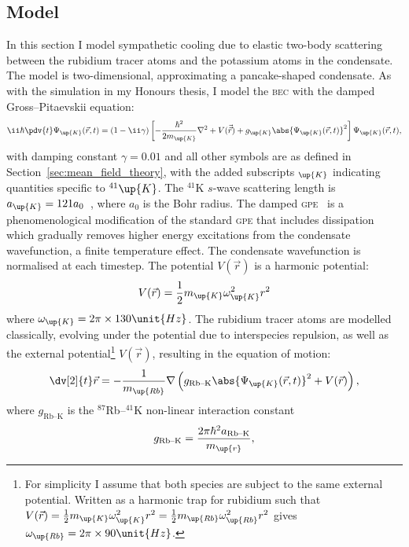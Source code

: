 \subsection{Model}

In this section I model sympathetic cooling due to elastic two-body scattering between the rubidium tracer atoms and the potassium atoms in the condensate. The model is two-dimensional, approximating a pancake-shaped condensate. As with the simulation in my Honours thesis, I model the \textsc{bec} with the damped Gross--Pitaevskii equation:
\begin{align}
\ii\hbar\pdv{t} \Psi_\up{K}(\vec r, t) = (1-\ii\gamma)\left[-\frac{\hbar^2}{2m_\up{K}}\nabla^2 + V(\vec{\vec r}) + g_\up{K}\abs{\Psi_\up{K}(\vec r, t)}^2\right]\Psi_\up{K}(\vec r, t),
\end{align}
with damping constant $\gamma=0.01$ and all other symbols are as defined in Section~\ref{sec:mean_field_theory}, with the added subscripts $_\up{K}$ indicating quantities specific to $^{41}\up{K}$. The $^{41}$K $s$-wave scattering length is $a_\up{K}=121 a_0$~\cite{cote_potassium_1998}, where $a_0$ is the Bohr radius. The damped \textsc{gpe}~\cite{tsubota_vortex_2002, madarassy_vortex_2008} is a phenomenological modification of the standard \textsc{gpe} that includes dissipation which gradually removes higher energy excitations from the condensate wavefunction, a finite temperature effect. The condensate wavefunction is normalised at each timestep. The potential $V(\vec r)$ is a harmonic potential:
\begin{align}
V(\vec r) = \frac12m_\up{K}\omega_\up{K}^2 r^2
\end{align}
where $\omega_\up{K}=2\pi\times 130\unit{Hz}$.
The rubidium tracer atoms are modelled classically, evolving under the potential due to interspecies repulsion, as well as the external potential\footnote{For simplicity I assume that both species are subject to the same external potential. Written as a harmonic trap for rubidium such that $V(\vec r) = \frac12m_\up{K}\omega_\up{K}^2 r^2 = \frac12m_\up{Rb}\omega_\up{Rb}^2 r^2$ gives $\omega_\up{Rb}= 2\pi\times 90\unit{Hz}$.} $V(\vec r)$, resulting in the equation of motion:
\begin{align}\label{eq:classical_motion_tracers}
\dv[2]{t} \vec r = -\frac1{m_\up{Rb}}\nabla\left({g_{\textrm{Rb--K}}} \abs{\Psi_\up{K}(\vec r, t)}^2 + V(\vec r)\right),
\end{align}
where $g_{\textrm{Rb--K}}$ is the $^{87}$Rb--$^{41}$K non-linear interaction constant
\begin{align}
g_{\textrm{Rb--K}} = \frac{2\pi\hbar^2 a_{\textrm{Rb--K}}}{m_\up{r}},
\end{align}
